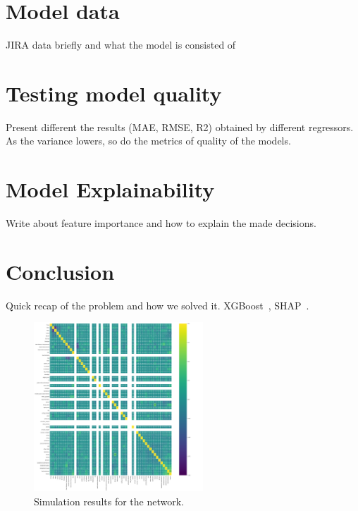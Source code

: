 \documentclass[conference,compsoc]{IEEEtran}
\begin{document}


\section{Model data}
JIRA data briefly and what the model is consisted of



\section{Testing model quality}
Present different the results (MAE, RMSE, R2) obtained by different regressors.
As the variance lowers, so do the metrics of quality of the models.

\section{Model Explainability}
Write about feature importance and how to explain the made decisions.


\section{Conclusion}
Quick recap of the problem and how we solved it.
XGBoost~\cite{chen2016xgboost}, SHAP~\cite{lundberg2020local2global}.

\begin{figure}[!t]
\centering
\includegraphics[width=2.5in]{feature_correlation.png}
\caption{Simulation results for the network.}
\label{fig_sim}
\end{figure}
\end{document}
